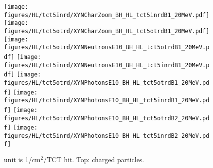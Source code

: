 \begin{figure}
  \begin{center}
    \texttt{[image: figures/HL/tct5inrd/XYNCharZoom\_BH\_HL\_tct5inrdB1\_20MeV.pdf]}
    \texttt{[image: figures/HL/tct5otrd/XYNCharZoom\_BH\_HL\_tct5otrdB1\_20MeV.pdf]} 
    \texttt{[image: figures/HL/tct5otrd/XYNNeutronsE10\_BH\_HL\_tct5otrdB1\_20MeV.pdf]}
    \texttt{[image: figures/HL/tct5inrd/XYNNeutronsE10\_BH\_HL\_tct5inrdB1\_20MeV.pdf]}
    \texttt{[image: figures/HL/tct5otrd/XYNPhotonsE10\_BH\_HL\_tct5otrdB1\_20MeV.pdf]}
    \texttt{[image: figures/HL/tct5inrd/XYNPhotonsE10\_BH\_HL\_tct5inrdB1\_20MeV.pdf]}
    \texttt{[image: figures/HL/tct5otrd/XYNPhotonsE10\_BH\_HL\_tct5otrdB2\_20MeV.pdf]}
    \texttt{[image: figures/HL/tct5inrd/XYNPhotonsE10\_BH\_HL\_tct5inrdB2\_20MeV.pdf]}

\end{center}
\vspace{-0.6cm}
 \caption{unit is 1/cm$^{2}$/TCT hit. Top: charged particles.
  \label{fig:XYN}}
\end{figure}

